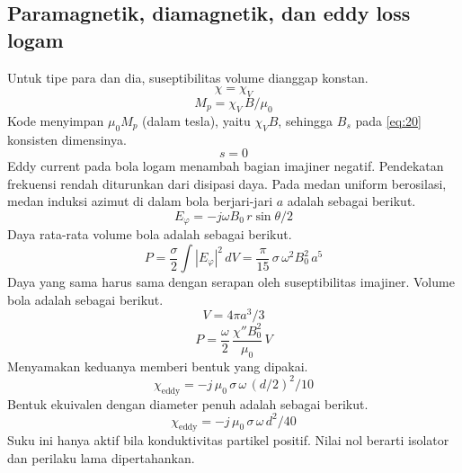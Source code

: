 \documentclass[a4paper,11pt]{article}
\begin{document}
\subsection{Paramagnetik, diamagnetik, dan eddy loss logam}
Untuk tipe para dan dia, suseptibilitas volume dianggap konstan.
\begin{equation*}
\chi = \chi_{V}
\end{equation*}
\begin{equation*}
M_{p} = \chi_{V}\,B/\mu_{0}
\end{equation*}
Kode menyimpan $\mu_{0}M_{p}$ (dalam tesla), yaitu $\chi_{V}B$,
sehingga $B_{s}$ pada \eqref{eq:20} konsisten dimensinya.
\begin{equation*}
s = 0
\end{equation*}
Eddy current pada bola logam menambah bagian imajiner negatif.
Pendekatan frekuensi rendah diturunkan dari disipasi daya. Pada medan
uniform berosilasi, medan induksi azimut di dalam bola berjari-jari $a$
adalah sebagai berikut.
\begin{equation*}
E_{\varphi} = -j\omega B_{0}\,r\sin\theta/2
\end{equation*}
Daya rata-rata volume bola adalah sebagai berikut.
\begin{equation*}
P = \frac{\sigma}{2}\int |E_{\varphi}|^{2}\,dV
= \frac{\pi}{15}\,\sigma\,\omega^{2}B_{0}^{2}\,a^{5}
\end{equation*}
Daya yang sama harus sama dengan serapan oleh suseptibilitas imajiner.
Volume bola adalah sebagai berikut.
\begin{equation*}
V = 4\pi a^{3}/3
\end{equation*}
\begin{equation*}
P = \frac{\omega}{2}\,\frac{\chi''B_{0}^{2}}{\mu_{0}}\,V
\end{equation*}
Menyamakan keduanya memberi bentuk yang dipakai.
\begin{equation*}
\chi_{\mathrm{eddy}} = -j\,\mu_{0}\,\sigma\,\omega\,(d/2)^{2}/10
\end{equation*}
Bentuk ekuivalen dengan diameter penuh adalah sebagai berikut.
\begin{equation*}
\chi_{\mathrm{eddy}} = -j\,\mu_{0}\,\sigma\,\omega\,d^{2}/40
\end{equation*}
Suku ini hanya aktif bila konduktivitas partikel positif.
Nilai nol berarti isolator dan perilaku lama dipertahankan.
\end{document}
